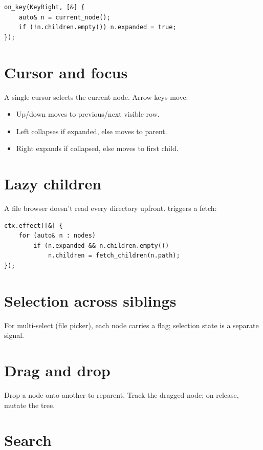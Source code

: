 \begin{lstlisting}
on_key(KeyRight, [&] {
    auto& n = current_node();
    if (!n.children.empty()) n.expanded = true;
});
\end{lstlisting}

\section{Cursor and focus}

A single cursor selects the current node. Arrow keys move:

\begin{itemize}[leftmargin=*]
  \item Up/down moves to previous/next visible row.
  \item Left collapses if expanded, else moves to parent.
  \item Right expands if collapsed, else moves to first
    child.
\end{itemize}

\section{Lazy children}

A file browser doesn't read every directory upfront.
 triggers a fetch:

\begin{lstlisting}
ctx.effect([&] {
    for (auto& n : nodes)
        if (n.expanded && n.children.empty())
            n.children = fetch_children(n.path);
});
\end{lstlisting}

\section{Selection across siblings}

For multi-select (file picker), each node carries a
 flag; selection state is a separate signal.

\section{Drag and drop}

Drop a node onto another to reparent. Track the dragged
node; on release, mutate the tree.

\section{Search}

